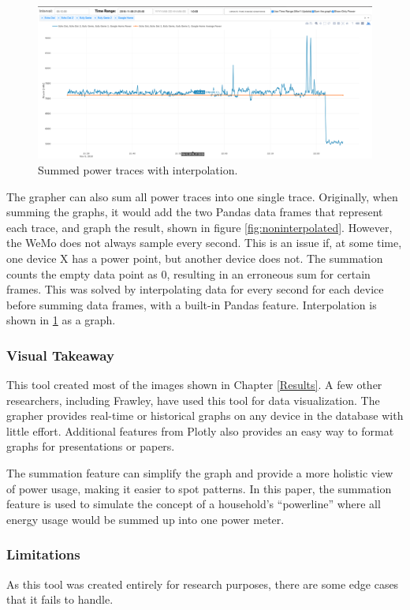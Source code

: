 \begin{figure}[H]
    \centering
    \includegraphics[width=1\textwidth]{figures/interpolated.png}
    \caption{Summed power traces with interpolation.}
    \label{fig:interpolated}
\end{figure}

The grapher can also sum all power traces into one single trace. Originally, when summing the graphs, it would add the two Pandas data frames that represent each trace, and graph the result, shown in figure \ref{fig:noninterpolated}. However, the WeMo does not always sample every second. This is an issue if, at some time, one device X has a power point, but another device does not. The summation counts the empty data point as 0, resulting in an erroneous sum for certain frames. This was solved by interpolating data for every second for each device before summing data frames, with a built-in Pandas feature. Interpolation is shown in \ref{fig:interpolated} as a graph.

\subsubsection{Visual Takeaway}
This tool created most of the images shown in Chapter \ref{Results}. A few other researchers, including Frawley, have used this tool for data visualization. The grapher provides real-time or historical graphs on any device in the database with little effort. Additional features from Plotly also provides an easy way to format graphs for presentations or papers.

The summation feature can simplify the graph and provide a more holistic view of power usage, making it easier to spot patterns. In this paper, the summation feature is used to simulate the concept of a household's ``powerline'' where all energy usage would be summed up into one power meter.

\subsubsection{Limitations}
As this tool was created entirely for research purposes, there are some edge cases that it fails to handle.

